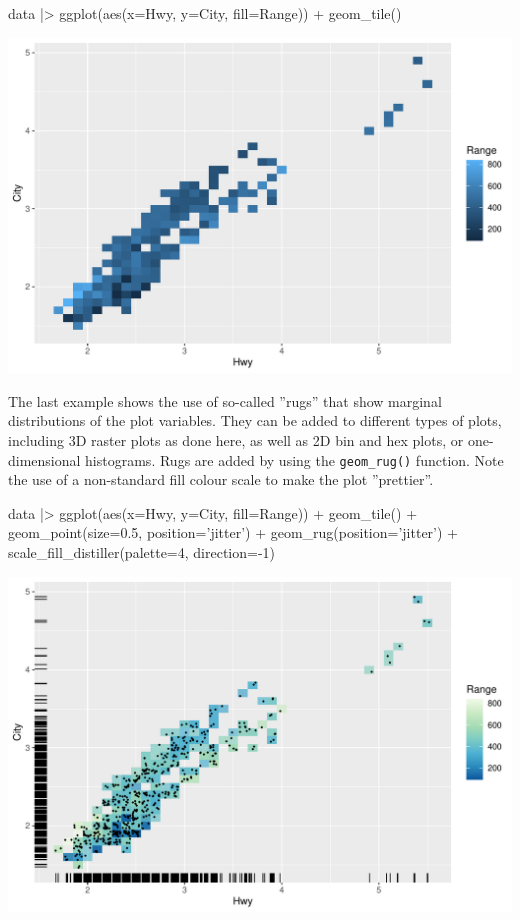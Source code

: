 \begin{samepage}
\begin{Rcode}
data |>
  ggplot(aes(x=Hwy, y=City, fill=Range)) + 
    geom_tile() 
\end{Rcode}
\end{samepage}

\begin{center}
  \includegraphics[width=.8\textwidth]{fuel.raster.pdf}
\end{center}

The last example shows the use of so-called ''rugs'' that show marginal distributions of the plot variables. They can be added to different types of plots, including 3D raster plots as done here, as well as 2D bin and hex plots, or one-dimensional histograms. Rugs are added by using the \texttt{geom\_rug()} function. Note the use of a non-standard fill colour scale to make the plot ''prettier''.

\begin{samepage}
\begin{Rcode}
data |>
  ggplot(aes(x=Hwy, y=City, fill=Range)) + 
    geom_tile() + 
    geom_point(size=0.5, position='jitter') +
    geom_rug(position='jitter') + 
    scale_fill_distiller(palette=4, direction=-1)
\end{Rcode}
\end{samepage}

\begin{center}
  \includegraphics[width=.8\textwidth]{fuel.raster.rug.pdf}
\end{center}

